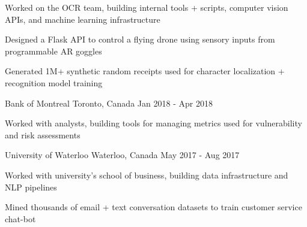 \documentclass[11pt, a4paper]{awesome-cv}
\begin{document}
\begin{siderules1}
\begin{cventries}
    {
      \begin{cvitems}
        \item {Worked on the OCR team, building internal tools + scripts, computer vision APIs, and machine learning infrastructure}
        \item {Designed a Flask API to control a flying drone using sensory inputs from programmable AR goggles}
        \item {Generated 1M+ synthetic random receipts used for character localization + recognition model training}
      \end{cvitems}
    }
  \cventry
    {\textit{}}
    {Bank of Montreal}
    {Toronto, Canada}
    {Jan 2018 - Apr 2018}
    {
      \begin{cvitems}
        \item {Worked with analysts, building tools for managing metrics used for vulnerability and risk assessments}
      \end{cvitems}
    }
  \cventry
    {\textit{}}
    {University of Waterloo}
    {Waterloo, Canada}
    {May 2017 - Aug 2017}
    {
      \begin{cvitems}
        \item {Worked with university's school of business, building data infrastructure and NLP pipelines}
        \item {Mined thousands of email + text conversation datasets to train customer service chat-bot}
      \end{cvitems}
    }
\end{cventries}
\end{siderules1}
\end{document}

